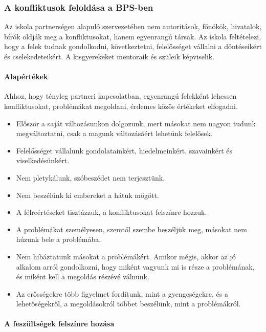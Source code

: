\hypertarget{a-bps-konfliktusok-feloldasa}{%
\subsubsection{A konfliktusok feloldása a BPS-ben}\label{a-bps-konfliktusok-feloldasa}}

Az iskola partnerségen alapuló szervezetében nem autoritások, főnökök,
hivatalok, bírók oldják meg a konfliktusokat, hanem egyenrangú társak.
Az iskola feltételezi, hogy a felek tudnak gondolkodni, következtetni,
felelősséget vállalni a döntéseikért és cselekedeteikért. A kisgyerekeket
mentoraik és szüleik képviselik.

\hypertarget{alapertekek}{%
\paragraph{Alapértékek}\label{alapertekek}}

Ahhoz, hogy tényleg partneri kapcsolatban, egyenrangú\break
felekként lehessen
konfliktusokat, problémákat megoldani, érdemes közös értékeket
elfogadni.

\begin{itemize}
\tightlist
\item
  Először a saját változásunkon dolgozunk, mert másokat nem nagyon tudunk
  megváltoztatni, csak a magunk változásáért lehetünk felelősek.
\item
  Felelősséget vállalunk gondolatainkért, hiedelmeinkért, szavainkért
  és viselkedésünkért.
\item
  Nem pletykálunk, szóbeszédet nem terjesztünk.
\item
  Nem beszélünk ki embereket a hátuk mögött.
\item
  A félreértéseket tisztázzuk, a konfliktusokat felszínre hozzuk.
\item
  A problémákat személyesen, szemtől szembe beszéljük meg, másokat nem
  húzunk bele a problémába.
\item
  Nem hibáztatunk másokat a problémákért. Amikor mégis, akkor az
  jó alkalom arról gondolkozni, hogy miként vagyunk mi is része a
  problémának, és miként kell a megoldás részévé válnunk.
\item
  Az erősségekre több figyelmet fordítunk, mint a gyengeségekre, és a
  lehetőségekről, a megoldásokról többet beszélünk, mint a problémákról.
\end{itemize}

\hypertarget{feszultseg-felszinre-hozasa}{%
\paragraph{A feszültségek felszínre
hozása}\label{feszultseg-felszinre-hozasa}}

